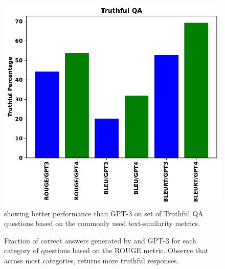 \begin{figure}[h!]
\centering
\label{fig:misconception_metrics1}
\includegraphics[width=0.49\linewidth]{fig_hp/Truthful_QA_Accuracy.pdf}
\caption{{\DV} showing better performance than GPT-3 on set of Truthful QA questions based on the commonly used text-similarity metrics.}
\label{fig:misconceptions_metrics}
\end{figure}



\begin{figure}[h!]
\centering
{}
\caption{Fraction of correct answers generated by \DV and GPT-3 for each category of questions based on the ROUGE metric. Observe that across most categories, \DV returns more truthful responses.}
\label{fig:misconceptions_rouge}
\end{figure}

